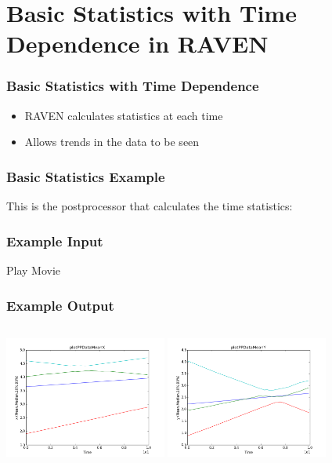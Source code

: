 \documentclass[t,9pt,svgnames]{beamer}
\begin{document}
\section{Basic Statistics with Time Dependence in RAVEN}

\begin{frame}
  \frametitle{Basic Statistics with Time Dependence}
  \begin{itemize}
  \item RAVEN calculates statistics at each time
  \item Allows trends in the data to be seen
  \end{itemize}
\end{frame}

\begin{frame}[fragile]
  \frametitle{Basic Statistics Example}
  This is the postprocessor that calculates the time statistics:
  

\end{frame}

\begin{frame}
  \frametitle{Example Input}
  Play Movie  
\end{frame}

\begin{frame}
  \frametitle{Example Output}
  \begin{columns}
    \includegraphics[height=4cm]{images/plotPPDataMeanX.png}
    \includegraphics[height=4cm]{images/plotPPDataMeanY.png}
  \end{columns}
\end{frame}
\end{document}
